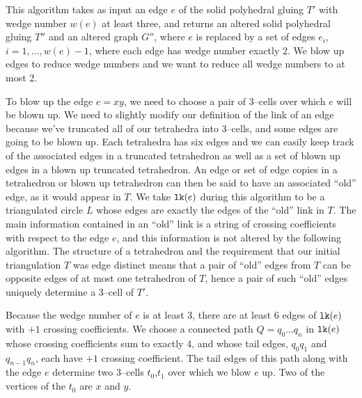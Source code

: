 \label{alg:blowup}

This algorithm takes as input an edge $e$ of the solid polyhedral gluing $T'$ with wedge number $w(e)$ at least three, and returns an altered solid polyhedral gluing $T''$ and an altered graph $G''$, where $e$ is replaced by a set of edges $e_i$, $i=1,\dots ,w(e)-1$, where each edge has wedge number exactly 2.
We blow up edges to reduce wedge numbers and we want to reduce all wedge numbers to at most 2.

To blow up the edge $e=xy$, we need to choose a pair of 3--cells over which $e$ will be blown up.
We need to slightly modify our definition of the link of an edge because we've truncated all of our tetrahedra into 3--cells, and some edges are going to be blown up.
Each tetrahedra has six edges and we can easily keep track of the associated edges in a truncated tetrahedron as well as a set of blown up edges in a blown up truncated tetrahedron.
An edge or set of edge copies in a tetrahedron or blown up tetrahedron can then be said to have an associated ``old'' edge, as it would appear in $T$.
We take $\texttt{lk}(e)$ during this algorithm to be a triangulated circle $L$ whose edges are exactly the edges of the ``old'' link in $T$.
The main information contained in an ``old'' link is a string of crossing coefficients with respect to the edge $e$, and this information is not altered by the following algorithm.
The structure of a tetrahedron and the requirement that our initial triangulation $T$ was edge distinct means that a pair of ``old'' edges from $T$ can be opposite edges of at most one tetrahedron of $T$, hence a pair of such ``old'' edges uniquely determine a 3--cell of $T'$.

Because the wedge number of $e$ is at least 3, there are at least 6 edges of $\texttt{lk}(e)$ with $+1$ crossing coefficients.
We choose a connected path $Q=q_0 \dots q_n$ in $\texttt{lk}(e)$ whose crossing coefficients sum to exactly 4, and whose tail edges, $q_0 q_1$ and $q_{n-1}q_n$, each have $+1$ crossing coefficient.
The tail edges of this path along with the edge $e$ determine two 3--cells $t_0$,$t_1$ over which we blow $e$ up.
Two of the vertices of the $t_0$ are $x$ and $y$.

